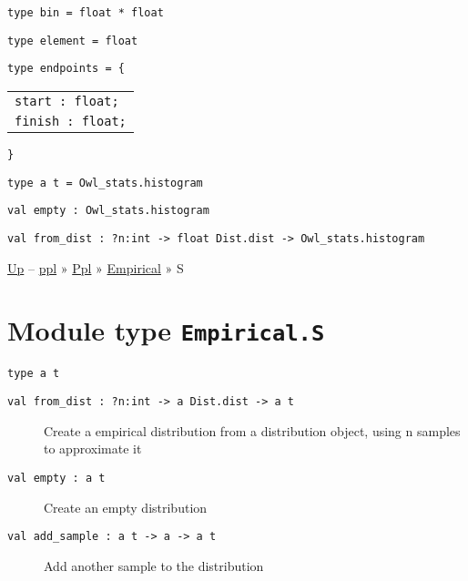 \protect\hyperlink{type-bin}{}\texttt{type\ bin}\texttt{\ =\ float\ *\ float}

\protect\hyperlink{type-element}{}\texttt{type\ element}\texttt{\ =\ float}

\protect\hyperlink{type-endpoints}{}\texttt{type\ endpoints}\texttt{\ =\ }\texttt{\{}

\begin{longtable}[c]{@{}l@{}}
\toprule
\protect\hyperlink{type-endpoints.start}{}\texttt{start\ :\ float;}\tabularnewline
\protect\hyperlink{type-endpoints.finish}{}\texttt{finish\ :\ float;}\tabularnewline
\bottomrule
\end{longtable}

\texttt{\}}

\protect\hyperlink{type-t}{}\texttt{type\ \textquotesingle{}a\ t}\texttt{\ =\ Owl\_stats.histogram}

\protect\hyperlink{val-empty}{}\texttt{val\ empty\ :\ Owl\_stats.histogram}

\protect\hyperlink{val-fromux5fdist}{}\texttt{val\ from\_dist\ :\ ?⁠n:int\ -\textgreater{}\ float\ Dist.dist\ -\textgreater{}\ Owl\_stats.histogram}

\href{../index.html}{Up} -- \href{../../../index.html}{ppl} »
\href{../../index.html}{Ppl} » \href{../index.html}{Empirical} » S

\section{\texorpdfstring{Module type
\texttt{Empirical.S}}{Module type Empirical.S}}\label{module-type-empirical.s}

\protect\hyperlink{type-t}{}\texttt{type\ \textquotesingle{}a\ t}

\begin{description}
\item[{\protect\hyperlink{val-fromux5fdist}{}\texttt{val\ from\_dist\ :\ ?⁠n:int\ -\textgreater{}\ \textquotesingle{}a\ Dist.dist\ -\textgreater{}\ \textquotesingle{}a\ t}}]
Create a empirical distribution from a distribution object, using n
samples to approximate it
\end{description}

\begin{description}
\item[{\protect\hyperlink{val-empty}{}\texttt{val\ empty\ :\ \textquotesingle{}a\ t}}]
Create an empty distribution
\end{description}

\begin{description}
\item[{\protect\hyperlink{val-addux5fsample}{}\texttt{val\ add\_sample\ :\ \textquotesingle{}a\ t\ -\textgreater{}\ \textquotesingle{}a\ -\textgreater{}\ \textquotesingle{}a\ t}}]
Add another sample to the distribution
\end{description}

